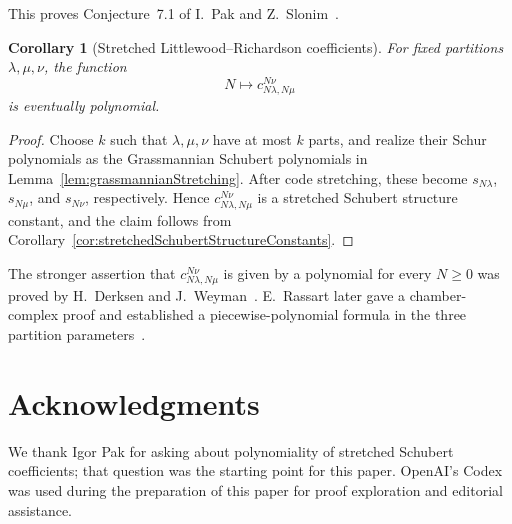\documentclass[11pt,reqno]{amsart}
\newtheorem{corollary}[theorem]{Corollary}
\theoremstyle{definition}
\begin{document}
This proves Conjecture~7.1 of I.~Pak and Z.~Slonim~\cite{PakSlonim2026x}.

\begin{corollary}[Stretched Littlewood--Richardson coefficients]
\label{cor:stretchedLittlewoodRichardson}
For fixed partitions \(\lambda,\mu,\nu\), the function
\[
N\longmapsto c_{N\lambda,N\mu}^{N\nu}
\]
is eventually polynomial.
\end{corollary}

\begin{proof}
Choose \(k\) such that \(\lambda,\mu,\nu\) have at most \(k\) parts, and
realize their Schur polynomials as the Grassmannian Schubert polynomials in
Lemma~\ref{lem:grassmannianStretching}.  After code stretching, these become
\(s_{N\lambda}\), \(s_{N\mu}\), and \(s_{N\nu}\), respectively.  Hence
\(c_{N\lambda,N\mu}^{N\nu}\) is a stretched Schubert structure constant, and
the claim follows from
Corollary~\ref{cor:stretchedSchubertStructureConstants}.
\end{proof}

The stronger assertion that \(c_{N\lambda,N\mu}^{N\nu}\) is given by a
polynomial for every \(N\geq0\) was proved by H.~Derksen and
J.~Weyman~\cite{DerksenWeyman2002}.  E.~Rassart later gave a chamber-complex
proof and established a piecewise-polynomial formula in the three partition
parameters~\cite{Rassart2004}.

\section*{Acknowledgments}

We thank Igor Pak for asking about polynomiality of stretched Schubert
coefficients; that question was the starting point for this paper.
OpenAI's Codex was used during the preparation of this paper for proof
exploration and editorial assistance.



\end{document}
